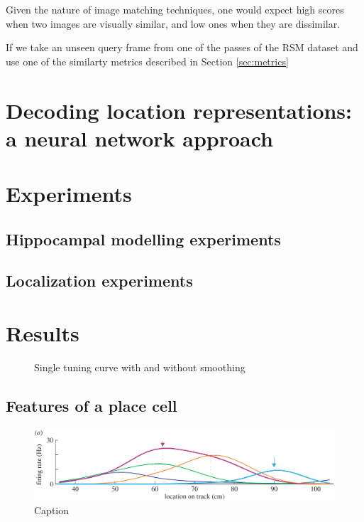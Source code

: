 Given the nature of image matching techniques, one would expect high scores when two images are visually similar, and low ones when they are dissimilar. 


If we take an unseen query frame from one of the passes of the RSM dataset and use one of the similarty metrics described in Section \ref{sec:metrics}

\section{Decoding location representations: a neural network approach}


\section{Experiments}

\subsection{Hippocampal modelling experiments}

\subsection{Localization experiments}

\section{Results}

\begin{figure}
	\centering
	\setlength{}
	\setlength{}
		
	\caption{Single tuning curve with and without smoothing}
\end{figure}

\subsection{Features of a place cell}

\begin{figure}
\centering
\includegraphics[width=\linewidth]{./gfx/Chapter05//dragoi_et_al_place_cell.png}
\caption{Caption}
\label{}
\end{figure}

